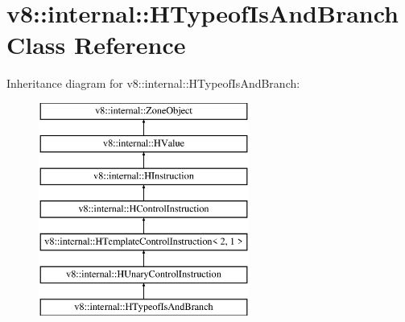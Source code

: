 \hypertarget{classv8_1_1internal_1_1_h_typeof_is_and_branch}{}\section{v8\+:\+:internal\+:\+:H\+Typeof\+Is\+And\+Branch Class Reference}
\label{classv8_1_1internal_1_1_h_typeof_is_and_branch}
Inheritance diagram for v8\+:\+:internal\+:\+:H\+Typeof\+Is\+And\+Branch\+:\begin{figure}[H]
\begin{center}
\leavevmode
\includegraphics[height=7.000000cm]{classv8_1_1internal_1_1_h_typeof_is_and_branch}
\end{center}
\end{figure}
